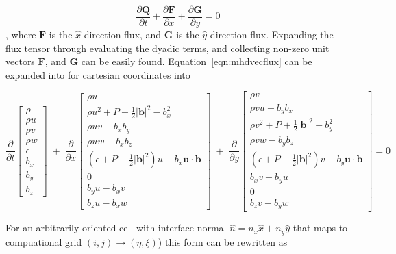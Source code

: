 \documentclass[paper=a4, fontsize=11pt]{scrartcl}
\newcommand{\pfrac}[2]{\frac{\partial#1}{\partial#2}}
\numberwithin{equation}{section}                %
\numberwithin{figure}{section}                  %
\numberwithin{table}{section}                           %
\begin{document}
\begin{equation} \label{eqn:mhdvecflux}
  \pfrac{\mathbf{Q}}{t} + \pfrac{\mathbf{F}}{x} + \pfrac{\mathbf{G}}{y} = 0
\end{equation},
where $\mathbf{F}$ is the $\hat{x}$ direction flux, and $\mathbf{G}$ is the $\hat{y}$ direction flux. Expanding the flux tensor through evaluating the dyadic terms, and collecting non-zero unit vectors $\mathbf{F}$, and $\mathbf{G}$ can be easily found. Equation~\ref{eqn:mhdvecflux} can be expanded into for cartesian coordinates into

\[
  \pfrac{}{t}
  \begin{bmatrix}
    \rho  \\
    \rho u  \\
    \rho v \\
    \rho w \\
    \epsilon\\
    b_x \\
    b_y \\
    b_z 
  \end{bmatrix}
  \;+\;\pfrac{}{x}
  \begin{bmatrix}
    \rho u  \\
    \rho u^2 + P + \frac{1}{2}|\mathbf{b}|^2 - b_x^2\\
    \rho u v - b_x b_y \\
    \rho u w - b_x b_z \\
    \left(\epsilon+ P + \frac{1}{2}|\mathbf{b}|^2 \right) u - b_x \mathbf{u}\cdot\mathbf{b}\\
    0 \\
    b_y u - b_x v \\
    b_z u - b_x w 
  \end{bmatrix}
  \;+\;\pfrac{}{y}
  \begin{bmatrix}
    \rho v  \\
    \rho v u - b_y b_x\\
    \rho v^2 + P + \frac{1}{2}|\mathbf{b}|^2 - b_y^2\\
    \rho v w - b_y b_z \\
    \left(\epsilon+ P + \frac{1}{2}|\mathbf{b}|^2  \right) v - b_y\mathbf{u}\cdot\mathbf{b}\\
    b_x v - b_y u \\
    0 \\
    b_z v - b_y w 
  \end{bmatrix}
  =0
\]

For an arbitrarily oriented cell with interface normal $\hat{n} = n_x \hat{x} + n_y\hat{y}$ that maps to compuational grid $(i,j)\rightarrow(\eta,\xi)$) this form can be rewritten as
\end{document}
